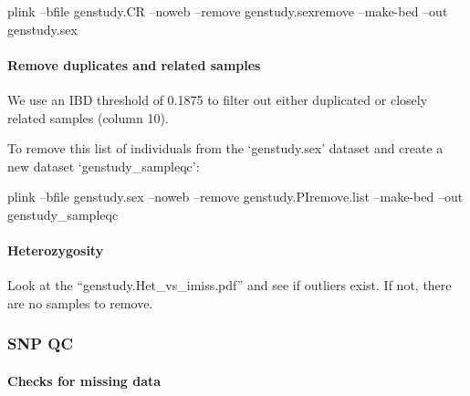 \documentclass[]{book}
\newenvironment{Shaded}{\begin{snugshade}}{\end{snugshade}}
\newcommand{\StringTok}[1]{\textcolor[rgb]{0.31,0.60,0.02}{#1}}
\newcommand{\FunctionTok}[1]{\textcolor[rgb]{0.00,0.00,0.00}{#1}}
\newcommand{\OperatorTok}[1]{\textcolor[rgb]{0.81,0.36,0.00}{\textbf{#1}}}
\newcommand{\ExtensionTok}[1]{#1}
\newcommand{\NormalTok}[1]{#1}
\let\oldparagraph\paragraph
\renewcommand{\paragraph}[1]{\oldparagraph{#1}\mbox{}}
\begin{document}
\begin{Shaded}
\begin{Highlighting}[]
\ExtensionTok{plink}\NormalTok{ --bfile genstudy.CR --noweb --remove genstudy.sexremove --make-bed --out genstudy.sex}
\end{Highlighting}
\end{Shaded}

\paragraph{Remove duplicates and related
samples}\label{remove-duplicates-and-related-samples}

We use an IBD threshold of 0.1875 to filter out either duplicated or
closely related samples (column 10).

\begin{Shaded}
\end{Shaded}

To remove this list of individuals from the `genstudy.sex' dataset and
create a new dataset `genstudy\_sampleqc':

\begin{Shaded}
\begin{Highlighting}[]
\ExtensionTok{plink}\NormalTok{ --bfile genstudy.sex --noweb --remove genstudy.PIremove.list --make-bed --out genstudy_sampleqc}
\end{Highlighting}
\end{Shaded}

\paragraph{Heterozygosity}\label{heterozygosity-1}

Look at the ``genstudy.Het\_vs\_imiss.pdf'' and see if outliers exist.
If not, there are no samples to remove.

\subsubsection{SNP QC}\label{snp-qc}

\paragraph{Checks for missing data}\label{checks-for-missing-data-1}
\end{document}
